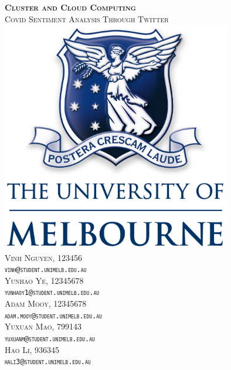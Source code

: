 \begin{titlepage}


\center %
 
\vfill
\textsc{\large\textbf{Cluster and Cloud Computing} \\[1cm]\LARGE{Covid Sentiment Analysis Through Twitter }}
\vfill
\includegraphics[width=10cm]{images/unimelblogo.png}
\vfill
\vspace{5mm}\\
\textsc{ Vinh Nguyen, 123456\\
    \texttt{vinh@student.unimelb.edu.au} }\\
    \vspace{5mm}
\textsc{ Yunhao Ye, 12345678\\
    \texttt{yunhaoy1@student.unimelb.edu.au}}\\
        \vspace{5mm}
\textsc{ Adam Mooy, 12345678\\
    \texttt{adam.mooy@student.unimelb.edu.au}}\\
    \vspace{5mm}
\textsc{ Yuxuan Mao, 799143\\
    \texttt{yuxuanm@student.unimelb.edu.au}}\\
    \vspace{5mm}
\textsc{ Hao Li, 936345\\
    \texttt{hali3@student.unimelb.edu.au}}
\end{titlepage}
